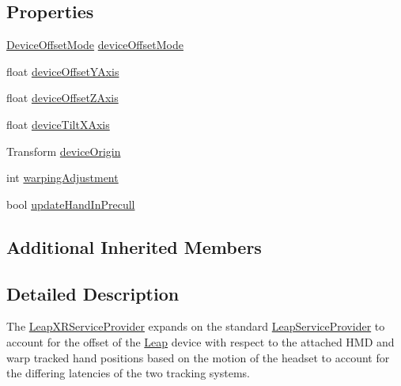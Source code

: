 \subsection*{Properties}
\begin{DoxyCompactItemize}
\item 
\mbox{\hyperlink{class_leap_1_1_unity_1_1_leap_x_r_service_provider_afb41f717d7d9f36bbc119f06440b83f6}{Device\+Offset\+Mode}} \mbox{\hyperlink{class_leap_1_1_unity_1_1_leap_x_r_service_provider_a059badc9c65f387e3bce56259d02c384}{device\+Offset\+Mode}}
\item 
float \mbox{\hyperlink{class_leap_1_1_unity_1_1_leap_x_r_service_provider_a6c906e4ec5e7775596344ec87fda4681}{device\+Offset\+Y\+Axis}}
\item 
float \mbox{\hyperlink{class_leap_1_1_unity_1_1_leap_x_r_service_provider_ab78d04f47fd47ce45f7e5da319e29cee}{device\+Offset\+Z\+Axis}}
\item 
float \mbox{\hyperlink{class_leap_1_1_unity_1_1_leap_x_r_service_provider_aabddae01cbb798a7cf340a2e1676e8ed}{device\+Tilt\+X\+Axis}}
\item 
Transform \mbox{\hyperlink{class_leap_1_1_unity_1_1_leap_x_r_service_provider_a5f4a006ae4fbb332ab62796eb060af1e}{device\+Origin}}
\item 
int \mbox{\hyperlink{class_leap_1_1_unity_1_1_leap_x_r_service_provider_a668f8752cd2db6f77abbd44e89980b79}{warping\+Adjustment}}
\item 
bool \mbox{\hyperlink{class_leap_1_1_unity_1_1_leap_x_r_service_provider_ae9458c66f5008c4592c6f94453b0b043}{update\+Hand\+In\+Precull}}
\end{DoxyCompactItemize}
\subsection*{Additional Inherited Members}


\subsection{Detailed Description}
The \mbox{\hyperlink{class_leap_1_1_unity_1_1_leap_x_r_service_provider}{Leap\+X\+R\+Service\+Provider}} expands on the standard \mbox{\hyperlink{class_leap_1_1_unity_1_1_leap_service_provider}{Leap\+Service\+Provider}} to account for the offset of the \mbox{\hyperlink{namespace_leap_1_1_unity_1_1_leap}{Leap}} device with respect to the attached H\+MD and warp tracked hand positions based on the motion of the headset to account for the differing latencies of the two tracking systems. 



